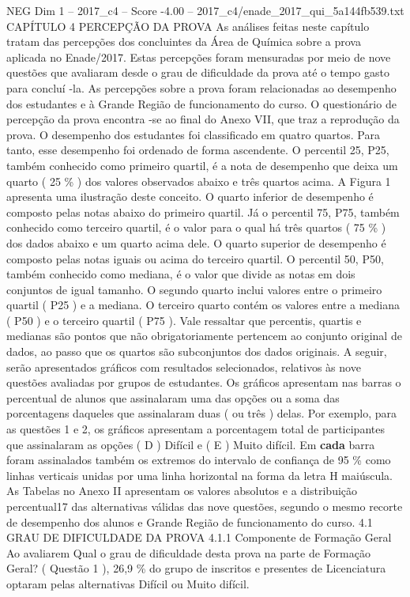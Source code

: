 \begin{textsample}{NEG Dim 1 – 2017\_c4 – Score -4.00 – 2017\_c4/enade\_2017\_qui\_5a144fb539.txt}  \label{ex:f1_neg_168}
CAPÍTULO 4 PERCEPÇÃO DA PROVA As análises feitas neste capítulo tratam das percepções dos concluintes da Área de Química sobre a prova aplicada no Enade/2017.
Estas percepções foram mensuradas por meio de nove questões que avaliaram desde o grau de dificuldade da prova até o tempo gasto para concluí -la.
As percepções sobre a prova foram relacionadas ao desempenho dos estudantes e à Grande Região de funcionamento do curso.
O questionário de percepção da prova encontra -se ao final do Anexo VII, que traz a reprodução da prova.
O desempenho dos estudantes foi classificado em quatro quartos.
Para tanto, esse desempenho foi ordenado de forma ascendente.
O percentil 25, P25, também conhecido como primeiro quartil, é a nota de desempenho que deixa um quarto ( 25 \% ) dos valores observados abaixo e três quartos acima.
A Figura 1 apresenta uma ilustração deste conceito.
O quarto inferior de desempenho é composto pelas notas abaixo do primeiro quartil.
Já o percentil 75, P75, também conhecido como terceiro quartil, é o valor para o qual há três quartos ( 75 \% ) dos dados abaixo e um quarto acima dele.
O quarto superior de desempenho é composto pelas notas iguais ou acima do terceiro quartil.
O percentil 50, P50, também conhecido como mediana, é o valor que divide as notas em dois conjuntos de igual tamanho.
O segundo quarto inclui valores entre o primeiro quartil ( P25 ) e a mediana.
O terceiro quarto contém os valores entre a mediana ( P50 ) e o terceiro quartil ( P75 ).
Vale ressaltar que percentis, quartis e medianas são pontos que não obrigatoriamente pertencem ao conjunto original de dados, ao passo que os quartos são subconjuntos dos dados originais.
A seguir, serão apresentados gráficos com resultados selecionados, relativos às nove questões avaliadas por grupos de estudantes.
Os gráficos apresentam nas barras o percentual de alunos que assinalaram uma das opções ou a soma das porcentagens daqueles que assinalaram duas ( ou três ) delas.
Por exemplo, para as questões 1 e 2, os gráficos apresentam a porcentagem total de participantes que assinalaram as opções ( D ) Difícil e ( E ) Muito difícil.
Em \textbf{cada} barra foram assinalados também os extremos do intervalo de confiança de 95 \% como linhas verticais unidas por uma linha horizontal na forma da letra H maiúscula.
As Tabelas no Anexo II apresentam os valores absolutos e a distribuição percentual17 das alternativas válidas das nove questões, segundo o mesmo recorte de desempenho dos alunos e Grande Região de funcionamento do curso. 4.1 GRAU DE DIFICULDADE DA PROVA 4.1.1 Componente de Formação Geral Ao avaliarem Qual o grau de dificuldade desta prova na parte de Formação Geral? ( Questão 1 ), 26,9 \% do grupo de inscritos e presentes de Licenciatura optaram pelas alternativas Difícil ou Muito difícil.

\end{textsample}
